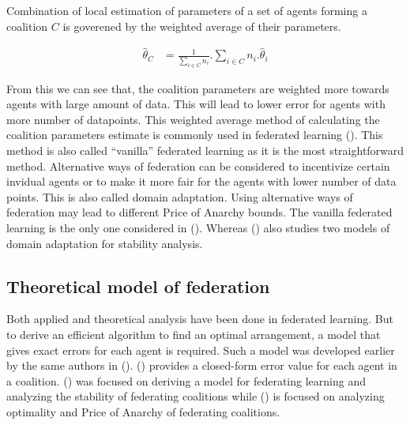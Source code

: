 \documentclass{article}
\begin{document}
Combination of local estimation of parameters of a set of agents forming a coalition $C$ is goverened by the weighted average of their parameters.

\begin{align}\label{eq:avged}
  \hat{\theta}_C &= \frac{1}{\sum_{i \in C} n_i} . \sum_{i \in C} n_i . \hat{\theta}_i
\end{align}

From this we can see that, the coalition parameters are weighted more towards agents with large amount of data. This will lead to lower error for agents with more number of datapoints. This weighted average method of calculating the coalition parameters estimate is commonly used in federated learning (\cite{mcmahan2016communicationefficient}). This method is also called ``vanilla'' federated learning as it is the most straightforward method. Alternative ways of federation can be considered to incentivize certain invidual agents or to make it more fair for the agents with lower number of data points. This is also called domain adaptation. Using alternative ways of federation may lead to different Price of Anarchy bounds. The vanilla federated learning is the only one considered in (\cite{donahue2021opt}). Whereas (\cite{donahue202model}) also studies two models of domain adaptation for stability analysis.

\subsection{Theoretical model of federation}

Both applied and theoretical analysis have been done in federated learning. But to derive an efficient algorithm to find an optimal arrangement, a model that gives exact errors for each agent is required. Such a model was developed earlier by the same authors in (\cite{donahue2020model}). (\cite{donahue2020model}) provides a closed-form error value for each agent in a coalition. (\cite{donahue2020model}) was focused on deriving a model for federating learning and analyzing the stability of federating coalitions while (\cite{donahue2021opt}) is focused on analyzing optimality and Price of Anarchy of federating coalitions.
\end{document}
